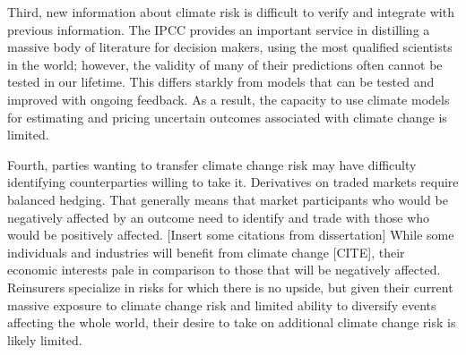 \documentclass[authoryear]{article}
\begin{document}

Third, new information about climate risk is difficult to verify and integrate with previous information. The IPCC provides an important service in distilling a massive body of literature for decision makers, using the most qualified scientists in the world; however, the validity of many of their predictions often cannot be tested in our lifetime. This differs starkly from models that can be tested and improved with ongoing feedback. As a result, the capacity to use climate models for estimating and pricing uncertain outcomes associated with climate change is limited.

Fourth, parties wanting to transfer climate change risk may have difficulty identifying counterparties willing to take it. Derivatives on traded markets require balanced hedging. That generally means that market participants who would be negatively affected by an outcome need to identify and trade with those who would be positively affected. [Insert some citations from dissertation] While some individuals and industries will benefit from climate change [CITE], their economic interests pale in comparison to those that will be negatively affected. Reinsurers specialize in risks for which there is no upside, but given their current massive exposure to climate change risk and limited ability to diversify events affecting the whole world, their desire to take on additional climate change risk is likely limited.
\end{document}

